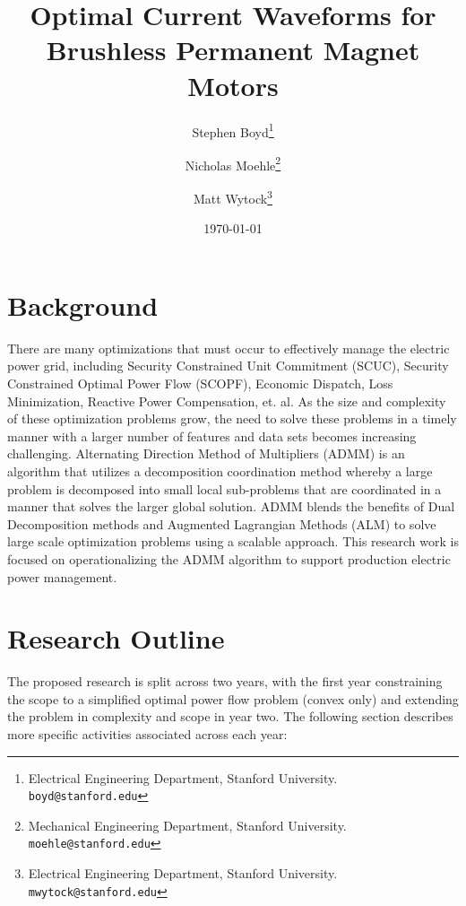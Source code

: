 \documentclass[12pt]{article}
\title{Optimal Current Waveforms for Brushless Permanent Magnet Motors}
\author{
Stephen Boyd\thanks{
Electrical Engineering Department, Stanford University. 
\texttt{boyd@stanford.edu}}
\and Nicholas Moehle\thanks{
Mechanical Engineering Department, Stanford University. 
\texttt{moehle@stanford.edu}}
\and Matt Wytock\thanks{
Electrical Engineering Department, Stanford University. 
\texttt{mwytock@stanford.edu}}
}
\date{\today}
\begin{document}
\maketitle

\section{Background}

There are many optimizations that must occur
to effectively manage the electric power grid,
including Security Constrained Unit Commitment (SCUC),
Security Constrained Optimal Power Flow (SCOPF),
Economic Dispatch, Loss Minimization, Reactive Power Compensation, et. al.
As the size and complexity of these optimization problems grow,
the need to solve these problems in a timely manner
with a larger number of features and data sets
becomes increasing challenging.
Alternating Direction Method of Multipliers (ADMM)
is an algorithm that utilizes a decomposition coordination method
whereby a large problem is decomposed into small local sub-problems
that are coordinated in a manner that solves the larger global solution.
ADMM blends the benefits of Dual Decomposition methods
and Augmented Lagrangian Methods (ALM)
to solve large scale optimization problems using a scalable approach.
This research work is focused on operationalizing the ADMM algorithm
to support production electric power management.

\section{Research Outline}
The proposed research is split across two years,
with the first year constraining the scope to a simplified
optimal power flow problem (convex only)
and extending the problem in complexity and scope in year two.
The following section describes more specific activities associated across each year:
\end{document}
